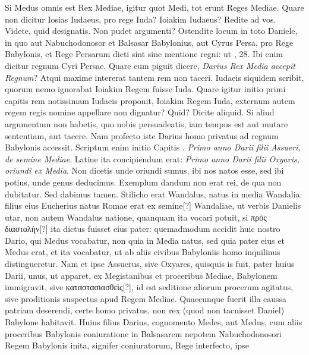 Si Medus omnis est Rex Mediae,
igitur quot Medi, tot erunt Reges Mediae.
Quare non dicitur Iosias
Iudaeus, pro rege Iuda?
Ioiakim Iudaeus?
Redite ad vos.
Videte, quid
designatis.
Non pudet argumenti?
Ostendite locum in toto Daniele,
in quo aut Nabuchodonosor et Balsasar Babylonius, aut Cyrus
Persa, pro Rege Babylonis, et Rege Persarum dicti sint sine mentione
regni: ut , 28.
Ibi enim dicitur regnum Cyri Persae.
Quare eum piguit dicere, \textit{Darius Rex Media accepit Regnum}?
Atqui maxime intererat
tantem rem non taceri.
Iudaeis siquidem scribit, quorum nemo
ignorabat Ioiakim Regem fuisse Iuda.
Quare igitur initio primi
capitis rem notissimam Iudaeis proponit, Ioiakim Regem Iuda, externum
autem regem regis nomine appellare non dignatur?
Quid?
Dicite aliquid.
Si aliud argumentum non habetis, quo nobis persuadeatis,
iam tempus est aut mutare sententiam, aut tacere.
Nam profecto iste Darius homo privatus ad regnum Babylonis accessit.
Scriptum
enim initio Capitis .
\textit{Primo anno Darii filii Assueri, de semine
Mediae}.
Latine ita concipiendum erat: \textit{Primo anno Darii filii Oxyaris,
oriundi ex Media}.
Non dicetis unde oriundi sumus, ibi nos natos
esse, sed ibi potius, unde genus deducimus.
Exemplum dandum
non erat rei, de qua non dubitatur.
Sed dabimus tamen.
Stilicho
erat Wandalus, natus in media Wandalia: filius eius Eucherius natus
Romae erat ex semine[?] Wandaliae, ut verbis Danielis utar, non autem
Wandalus natione, quanquam ita vocari potuit, si \textgreek{πρὸς διαστολὴν[?]}
ita dictus fuisset eius pater: quemadmodum accidit huic nostro
Dario, qui Medus vocabatur, non quia in Media natus, sed
quia pater eius et Medus erat, et ita vocabatur, ut ab aliis civibus
Babyloniis homo inquilinus distingueretur.
%
Nam et ipse Assuerus,
sive Oxyares, quisquis is fuit, pater huius Darii, unus, ut apparet,
ex Megistanibus et proceribus Mediae, Babylonem immigravit,
sive \textgreek{καταστασιασθεὶς[?]}, id est seditione aliorum procerum agitatus,
sive proditionis suspectus apud Regem Mediae.
Quaecunque fuerit
illa caussa patriam deserendi, certe homo privatus, non rex
(quod non tacuisset Daniel) Babylone habitavit.
Huius filius Darius,
cognomento Medes, aut Medus, cum aliis proceribus Babylonis
coniuratione in Balsasarem nepotem Nabuchodonosori Regem
Babylonis inita, signifer coniuratorum, Rege interfecto, ipse
